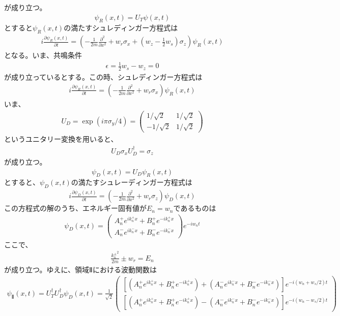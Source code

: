 が成り立つ。
\begin{align}
{\psi}_{R}(x,t)=U_{T}{\psi}(x,t)
\end{align}
$とすると{\psi}_{R}(x,t)の満たすシュレディンガー方程式は$
\begin{align}
i\frac{\partial {\psi}_{R}(x,t)}{\partial t}=\left(-\frac{1}{2m}\frac{\partial^2}{\partial x^2}+w_{r}{\sigma}_{x}+\left(w_{z}-\frac{1}{2}w_{s}\right){\sigma}_{z}\right){\psi}_{R}(x,t)
\end{align}
となる。いま、共鳴条件
\begin{align}
{\epsilon}=\frac{1}{2}w_{s}-w_{z}=0
\end{align}
が成り立っているとする。この時、シュレディンガー方程式は
\begin{align}
i\frac{\partial {\psi}_{R}(x,t)}{\partial t}=\left(-\frac{1}{2m}\frac{\partial^2}{\partial x^2}+w_{r}{\sigma}_{x}\right){\psi}_{R}(x,t)
\end{align}
いま、
\begin{align}
U_{D}=\exp(i{\pi}{\sigma}_{y}/4)=
\begin{pmatrix}
1/\sqrt{2} &1/\sqrt{2} \\
-1/\sqrt{2} &1/\sqrt{2}
\end{pmatrix}
\end{align}
というユニタリー変換を用いると、
\begin{align}
U_{D}{\sigma}_{x}U_{D}^{\dagger}={\sigma}_{z}
\end{align}
が成り立つ。
\begin{align}
{\psi}_{D}(x,t)=U_{D}{\psi}_{R}(x,t)
\end{align}
$とすると、{\psi}_{D}(x,t)の満たすシュレーディンガー方程式は$
\begin{align}
i\frac{\partial {\psi}_{D}(x,t)}{\partial t}=\left(-\frac{1}{2m}\frac{\partial^2}{\partial x^2}+w_{r}{\sigma}_{z}\right){\psi}_{D}(x,t)
\end{align}
$この方程式の解のうち、エネルギー固有値がE_{n}=w_{n}であるものは$
\begin{align}
{\psi}_{D}(x,t) =
\begin{pmatrix}
A_{n}^{+}e^{ik_{n}^{+}x}+B_{n}^{+}e^{-ik_{n}^{+}x}  \\
A_{n}^{-}e^{ik_{n}^{-}x}+B_{n}^{-}e^{-ik_{n}^{-}x}
\end{pmatrix}
e^{-iw_{n}t}
\end{align}
ここで、
\begin{align}
\frac{{k_{n}^{\pm}}^2}{2m}{\pm}w_{r}=E_{n}
\end{align}
が成り立つ。ゆえに、領域Ⅱにおける波動関数は
\begin{align}
{\psi}_{Ⅱ}(x,t)=U_{T}^{\dagger}U_{D}^{\dagger}{\psi}_{D}(x,t)=\frac{1}{\sqrt{2}}
\begin{pmatrix}
\left[(A_{n}^{+}e^{ik_{n}^{+}x}+B_{n}^{+}e^{-ik_{n}^{+}x})+(A_{n}^{-}e^{ik_{n}^{-}x}+B_{n}^{-}e^{-ik_{n}^{-}x})\right]e^{-i(w_{n}+w_{s}/2)t} \\
\left[(A_{n}^{+}e^{ik_{n}^{+}x}+B_{n}^{+}e^{-ik_{n}^{+}x})-(A_{n}^{-}e^{ik_{n}^{-}x}+B_{n}^{-}e^{-ik_{n}^{-}x})\right]e^{-i(w_{n}-w_{s}/2)t}
\end{pmatrix}
\end{align}

